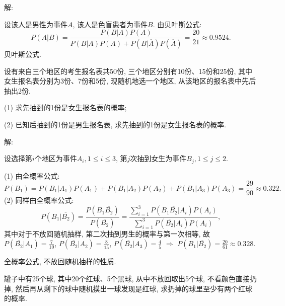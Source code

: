 \documentclass[standard]{ExBook}
\renewenvironment{shaded}{%
  \def\FrameCommand{\fboxsep=\FrameSep \colorbox{shadecolor}}%
  \MakeFramed{\advance\hsize-\width \FrameRestore}%
}{%
  \endMakeFramed
}
\begin{document}
\begin{qitems}
\vspace{\dimexpr2.5cm-5em\relax}

解: 

设该人是男性为事件$A$, 该人是色盲患者为事件$B$. 由贝叶斯公式:
$$P(A|B)=\frac{P(B|A)P(A)}{P(B|A)P(A)+P(B|\overline{A})P(\overline{A})}=\frac{20}{21}\approx0.9524.$$
\textcolor{themeColor}{\selectfont {} 贝叶斯公式.}

\vspace{2.5cm-5em}

    \begin{bbox}
    \begin{shaded}
        \qitem
设有来自三个地区的考生报名表共50份, 三个地区分别有10份、15份和25份, 其中女生报名表分别为3份、7份和5份, 现随机地选一个地区, 从该地区的报名表中先后抽出2份.

(1) 求先抽到的1份是女生报名表的概率;

(2) 已知后抽到的1份是男生报名表, 求先抽到的1份是女生报名表的概率.
    \end{shaded}
    \end{bbox}

\vspace{\dimexpr2.5cm-5em\relax}

解: 

设选择第$i$个地区为事件$A_{i},1 \leq i \leq 3$, 第$j$次抽到女生为事件$B_{j},1 \leq j \leq 2$.

(1) 由全概率公式:
$$P(B_{1})=P(B_{1}|A_{1})P(A_{1})+P(B_{1}|A_{2})P(A_{2})+P(B_{1}|A_{3})P(A_{3})=\frac{29}{90}\approx0.322.$$
(2) 同样由全概率公式:
$$P(B_{1}|\overline{B_{2}})=\frac{P(B_{1}\overline{B_{2}})}{P(\overline{B_{2}})}=\frac{\sum\limits_{i=1}^{3}P(B_{1}\overline{B_{2}}|A_{i})P(A_{i})}{\sum\limits_{i=1}^{3}P(\overline{B_{2}}|A_{i})P(A_{i})},$$
其中对于不放回随机抽样, 第二次抽到男生的概率与第一次相等, 故$P(\overline{B_{2}}|A_{1})=\frac{7}{10}$, $P(\overline{B_{2}}|A_{2})=\frac{8}{15}$, $P(\overline{B_{2}}|A_{3})=\frac{4}{5}$ $\Longrightarrow$ $P(B_{1}|\overline{B_{2}})=\frac{20}{61}\approx0.328$.

\textcolor{themeColor}{\selectfont {} 全概率公式, 不放回随机抽样的性质.}

\vspace{2.5cm-5em}

    \begin{bbox}
    \begin{shaded}
        \qitem
罐子中有25个球, 其中20个红球、5个黑球, 从中不放回取出5个球, 不看颜色直接扔掉, 然后再从剩下的球中随机摸出一球发现是红球, 求扔掉的球里至少有两个红球的概率.
    \end{shaded}
    \end{bbox}


\end{qitems}
\end{document}
